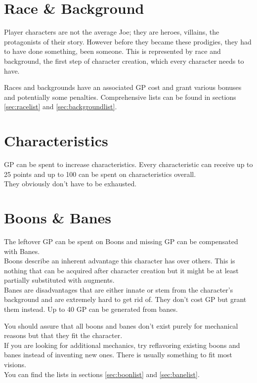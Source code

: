 \documentclass[12pt,a4paper,openany,usenames,dvipsnames]{book}
\begin{document}
	\section{Race \& Background}
	Player characters are not the average Joe; they are heroes, villains, the protagonists of their story. However before they became these prodigies, they had to have done something, been someone. This is represented by race and background, the first step of character creation, which every character needs to have.\par
	Races and backgrounds have an associated GP cost and grant various bonuses and potentially some penalties. Comprehensive lists can be found in sections \ref{sec:racelist} and \ref{sec:backgroundlist}.
	\section{Characteristics}
	GP can be spent to increase characteristics. Every characteristic can receive up to 25 points and up to 100 can be spent on characteristics overall.\\
	They obviously don’t have to be exhausted.
	\section{Boons \& Banes}
	The leftover GP can be spent on Boons and missing GP can be compensated with Banes.\\
	Boons describe an inherent advantage this character has over others. This is nothing that can be acquired after character creation but it might be at least partially substituted with augments.\\
	Banes are disadvantages that are either innate or stem from the character’s background and are extremely hard to get rid of. They don’t cost GP but grant them instead. Up to 40 GP can be generated from banes.
	\par
	You should assure that all boons and banes don’t exist purely for mechanical reasons but that they fit the character.\\
	If you are looking for additional mechanics, try reflavoring existing boons and banes instead of inventing new ones. There is usually something to fit most visions.\\
	You can find the lists in sections \ref{sec:boonlist} and \ref{sec:banelist}.
	
\end{document}
